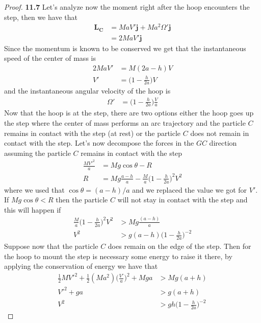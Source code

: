 \documentclass[11pt]{article}
\theoremstyle{definition}
\begin{document}
\begin{proof}{\textbf{11.7}}
    Let's analyze now the moment right after the hoop encounters the step, then
    we have that
    \begin{align*}
        \bm{L_C} &= MaV'\bm{j} + Ma^2 \Omega'\bm{j}\\
            &= 2MaV'\bm{j}
    \end{align*}
    Since the momentum is known to be conserved we get that the instantaneous
    speed of the center of mass is
    \begin{align*}
        2MaV' &= M(2a-h)V\\
        V' &= \bigg(1 - \frac{h}{2a}\bigg)V 
    \end{align*}
    and the instantaneous angular velocity of the hoop is
    \begin{align*}
        \Omega' &= \bigg(1 - \frac{h}{2a}\bigg)\frac{V}{a} 
    \end{align*}
\cleardoublepage
    Now that the hoop is at the step, there are two options either the hoop
    goes up the step where the center of mass performs an arc trajectory and
    the particle $C$ remains in contact with the step (at rest) or the particle
    $C$ does not remain in contact with the step. 
    Let's now decompose the forces in the $GC$ direction assuming the particle
    $C$ remains in contact with the step
    \begin{align*}
        \frac{MV'^2}{a} &= Mg\cos\theta - R\\
        R &= Mg\frac{a-h}{a} - \frac{M}{a}\bigg(1 - \frac{h}{2a}\bigg)^2V^2
    \end{align*}
    where we used that $\cos\theta = (a-h)/a$ and we replaced the value we got
    for $V'$. If $Mg\cos\theta < R$ then the particle $C$ will not stay in
    contact with the step and this will happen if
    \begin{align*}
        \frac{M}{a}\bigg(1 - \frac{h}{2a}\bigg)^2V^2 &> Mg\frac{(a-h)}{a}\\
        V^2 &> g(a-h) \bigg(1 - \frac{h}{2a}\bigg)^{-2}
    \end{align*}
    Suppose now that the particle $C$ does remain on the edge of the step.
    Then for the hoop to mount the step is necessary some energy to raise
    it there, by applying the conservation of energy we have that
    \begin{align*}
        \frac{1}{2}MV'^2 + \frac{1}{2}(Ma^2)\bigg(\frac{V'}{a}\bigg)^2 + Mga
        &>  Mg(a+h)\\
        V'^2 + ga &>  g(a+h)\\
        V^2 &> gh\bigg(1 - \frac{h}{2a}\bigg)^{-2} 

\end{align*}
\end{proof}
\end{document}
